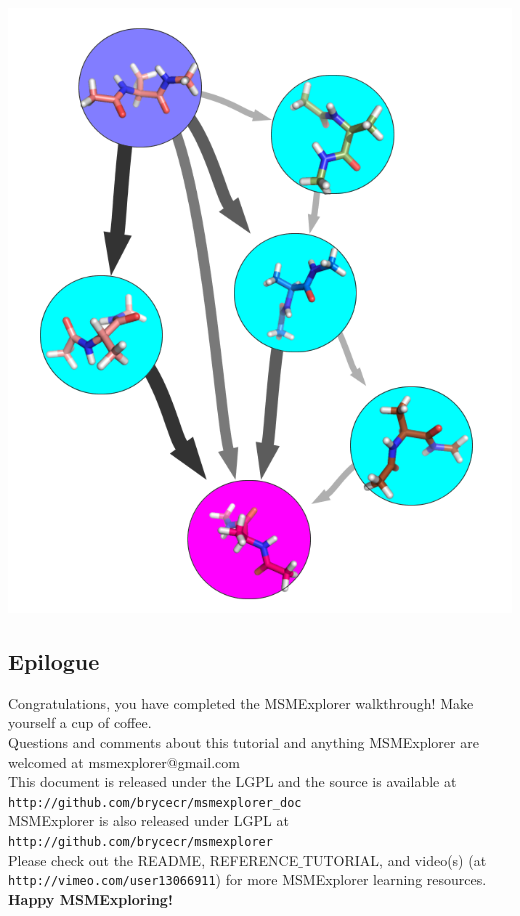 \documentclass[10pt,a4paper]{report}
\begin{document}
\begin{center}
\includegraphics[scale=.3]{TPTdemo.png}
\end{center}

\subsection*{Epilogue}

Congratulations, you have completed the MSMExplorer walkthrough! Make yourself a cup of coffee. 
\\

Questions and comments about this tutorial and anything MSMExplorer are welcomed at msmexplorer@gmail.com
\\

This document is released under the LGPL and the source is available at \texttt{http://github.com/brycecr/msmexplorer\_doc}
\\

MSMExplorer is also released under LGPL at 
\texttt{http://github.com/brycecr/msmexplorer}
\\

Please check out the README, REFERENCE$\_$TUTORIAL, and video(s) (at \texttt{http://vimeo.com/user13066911}) for more MSMExplorer learning resources. 
\\

\textbf{Happy MSMExploring!}
\end{document}
